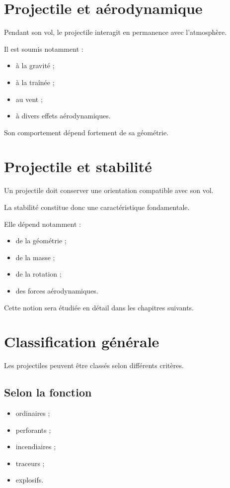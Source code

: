 \section{Projectile et aérodynamique}

Pendant son vol, le projectile interagit en permanence avec l'atmosphère.

Il est soumis notamment :

\begin{itemize}
    \item à la gravité ;
    \item à la traînée ;
    \item au vent ;
    \item à divers effets aérodynamiques.
\end{itemize}

Son comportement dépend fortement de sa géométrie.

\section{Projectile et stabilité}

Un projectile doit conserver une orientation compatible avec son vol.

La stabilité constitue donc une caractéristique fondamentale.

Elle dépend notamment :

\begin{itemize}
    \item de la géométrie ;
    \item de la masse ;
    \item de la rotation ;
    \item des forces aérodynamiques.
\end{itemize}

Cette notion sera étudiée en détail dans les chapitres suivants.

\section{Classification générale}

Les projectiles peuvent être classés selon différents critères.

\subsection{Selon la fonction}

\begin{itemize}
    \item ordinaires ;
    \item perforants ;
    \item incendiaires ;
    \item traceurs ;
    \item explosifs.
\end{itemize}


